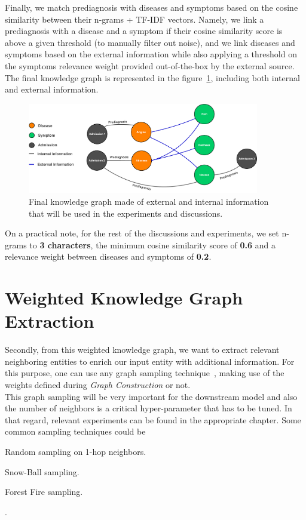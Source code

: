 Finally, we match prediagnosis with diseases and symptoms based on the cosine similarity between their n-grams + TF-IDF vectors. Namely, we link a prediagnosis with a disease and a symptom if their cosine similarity score is above a given threshold (to manually filter out noise), and we link diseases and symptoms based on the external information while also applying a threshold on the symptoms relevance weight provided out-of-the-box by the external source. The final knowledge graph is represented in the figure~\ref{fig:kg-healthcare}, including both internal and external information. \\

\begin{figure}[H]
 \centering
 \includegraphics[width=0.9\textwidth]{figures/kg-healthcare.pdf}
 \caption{Final knowledge graph made of external and internal information that will be used in the experiments and discussions.}
 \label{fig:kg-healthcare}
\end{figure}

On a practical note, for the rest of the discussions and experiments, we set n-grams to \textbf{3 characters}, the minimum cosine similarity score of \textbf{0.6} and a relevance weight between diseases and symptoms of \textbf{0.2}.

\newpage
\section{Weighted Knowledge Graph Extraction}
Secondly, from this weighted knowledge graph, we want to extract relevant neighboring entities to enrich our input entity with additional information. For this purpose, one can use any graph sampling technique~\cite{DBLP:journals/corr/HuL13, Leskovec:2006:SLG:1150402.1150479}, making use of the weights defined during \textit{Graph Construction} or not. \\

This graph sampling will be very important for the downstream model and also the number of neighbors is a critical hyper-parameter that has to be tuned. In that regard, relevant experiments can be found in the appropriate chapter. Some common sampling techniques could be \begin{enumerate*}\item Random sampling on 1-hop neighbors. \item Snow-Ball sampling. \item Forest Fire sampling.\end{enumerate*}. \\

